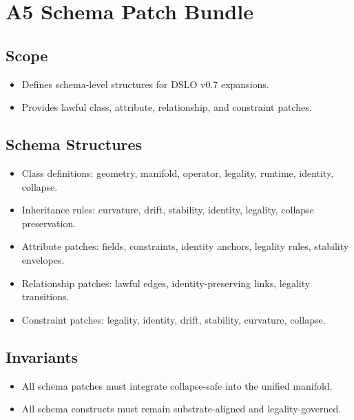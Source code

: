 \section{A5 Schema Patch Bundle}

\subsection{Scope}
\begin{itemize}
    \item Defines schema-level structures for DSLO v0.7 expansions.
    \item Provides lawful class, attribute, relationship, and constraint patches.
\end{itemize}

\subsection{Schema Structures}
\begin{itemize}
    \item Class definitions: geometry, manifold, operator, legality, runtime, identity, collapse.
    \item Inheritance rules: curvature, drift, stability, identity, legality, collapse preservation.
    \item Attribute patches: fields, constraints, identity anchors, legality rules, stability envelopes.
    \item Relationship patches: lawful edges, identity-preserving links, legality transitions.
    \item Constraint patches: legality, identity, drift, stability, curvature, collapse.
\end{itemize}

\subsection{Invariants}
\begin{itemize}
    \item All schema patches must integrate collapse-safe into the unified manifold.
    \item All schema constructs must remain substrate-aligned and legality-governed.
\end{itemize}
